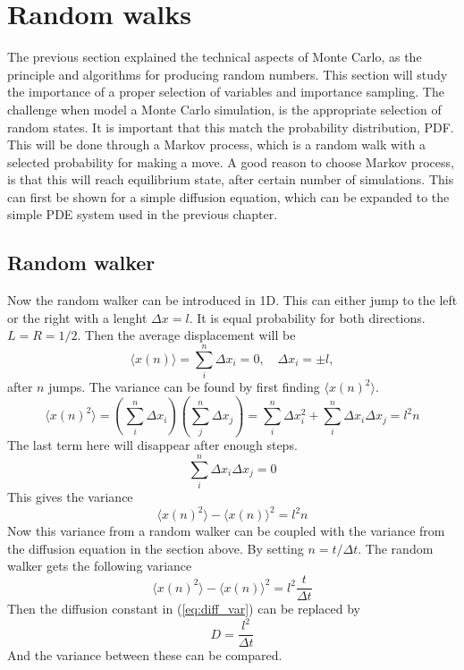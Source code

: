 \documentclass[%
twoside,                 %
final,                   %
chapterprefix=true,      %
open=right               %
10pt]{book}
\begin{document}
\section{Random walks}
The previous section explained the technical aspects of Monte Carlo, as the principle and algorithms for producing random numbers. This section will study the importance of a proper selection of variables and importance sampling. The challenge when model a Monte Carlo simulation, is the appropriate selection of random states. It is important that this match the probability distribution, PDF. This will be done through a Markov process, which is a random walk with a selected probability for making a move. A good reason to choose Markov process, is that this will reach equilibrium state, after certain number of simulations. This can first be shown for a simple diffusion equation, which can be expanded to the simple PDE system used in the previous chapter.


\subsection{Random walker}
Now the random walker can be introduced in 1D. This can either jump to the left or the right with a lenght $\Delta x = l$. It is equal probability for both directions. $L=R=1/2$. Then the average displacement will be 
\begin{equation}
 \langle x(n) \rangle = \sum^n_i \Delta x_i = 0, \quad \Delta x_i = \pm l,
\end{equation}
after $n$ jumps. The variance can be found by first finding $\langle x(n)^2 \rangle$.
\begin{equation}
\langle x(n)^2 \rangle = \left(\sum^n_i \Delta x_i\right)\left(\sum^n_j \Delta x_j\right) = \sum^n_i \Delta x_i^2 + \sum^n_i \Delta x_i \Delta x_j = l^2n
\end{equation}
The last term here will disappear after enough steps.  
\begin{equation}
\sum^n_i \Delta x_i \Delta x_j = 0
\end{equation}
This gives the variance
\begin{equation}
\langle x(n)^2 \rangle-\langle x(n) \rangle^2 = l^2n
\end{equation}
Now this variance from a random walker can be coupled with the variance from the diffusion equation in the section above. By setting $n = t/\Delta t$. The random walker gets the following variance
\begin{equation}
\langle x(n)^2 \rangle-\langle x(n) \rangle^2 = l^2\frac{t}{\Delta t}
\end{equation}
Then the diffusion constant in (\ref{eq:diff_var}) can be replaced by
\begin{equation}
D = \frac{l^2}{\Delta t}
\end{equation}
And the variance between these can be compared.
\end{document}
